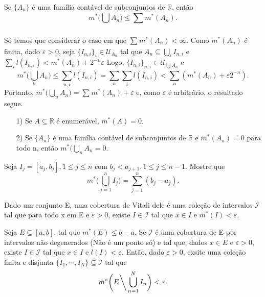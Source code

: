 \documentclass[analysis_notes.tex]{subfiles}
\begin{document}
\begin{lemma*}
	Se \(\{A_{n}\}\) é uma família contável de subconjuntos de \(\mathbb{R}\), então
	\[
		m^{*}\biggl(\bigcup_{}^{}{A_{n}}\biggr)\leq \sum\limits_{}^{}m^{*}(A_{n}).
	\]
\end{lemma*}
\begin{proof*}
	Só temos que considerar o caso em que \(\sum\limits_{}^{}m^{*}(A_{n}) < \infty.\) Como
	\(m^{*}(A_{n})\) é finita, dado \(\varepsilon  > 0\), seja \(\{I_{n, i}\}_{i}\in \mathcal{U}_{A_{n}}\) tal que
	\(A_{n}\subseteq{\bigcup_{i}^{}{I_{n, i}}}\) e \(\sum\limits_{i}^{}l(I_{n, i}) < m^{*}(A_{n}) + 2^{-n}\varepsilon\)
	Logo, \(\{I_{n, i}\}_{n, i}\in \mathcal{U}_{\bigcup_{}^{}{A_{n}}}\) e
	\[
		m^{*}\biggl(\bigcup_{n}^{}{A_{n}}\biggr)\leq \sum\limits_{n, i}^{}l(I_{n, i}) = \sum\limits_{n}^{}\sum\limits_{i}^{}l(I_{n, i}) < \sum\limits_{n}^{}(m^{*}(A_{n}) + \varepsilon 2^{-n}).
	\]
	Portanto, \(m^{*}\biggl(\bigcup_{n}^{}{A_{n}}\biggr) = \sum\limits_{}^{}m^{*}(A_{n}) + \varepsilon\) e, como \(\varepsilon \) é arbitrário, o resultado segue.
\end{proof*}
\begin{crl*}
	\begin{itemize}
		\item[1)] Se \(A\subseteq{\mathbb{R}}\) é enumerável, \(m^{*}(A) = 0.\)
		\item[2)] Se \(\{A_{n}\}\) é uma família contável de subconjuntos de \(\mathbb{R}\) e
		      \(m^{*}(A_{n}) = 0\) para todo n, então \(m^{*}(\bigcup_{n}^{}A_{n} = 0.\)
	\end{itemize}
\end{crl*}
\begin{example}
	Seja \(I_{j} = [a_{j}, b_{j}], 1\leq j\leq n\) com \(b_{j} < a_{j+1}, 1\leq j\leq n-1.\) Mostre que
	\[
		m^{*}\biggl(\bigcup_{j=1}^{n}{I_{j}}\biggr) = \sum\limits_{j=1}^{n}(b_{j}-a_{j}).
	\]
\end{example}
Dado um conjunto E, uma cobertura de Vitali dele é uma cole\c cão de intervalos
\(\mathcal{I}\) tal que para todo x em E e \(\varepsilon  > 0\), existe \(I\in \mathcal{I}\) tal que
\(x\in I\) e \(m^{*}(I) < \varepsilon .\)
\hypertarget{vitali_covering}{
	\begin{lemma*}
		Seja \(E\subseteq{[a, b]}\), tal que \(m^{*}(E)\leq b-a.\) Se \(\mathcal{I}\)
		é uma cobertura de E por intervalos não degenerados (Não é um ponto só) e tal que, dados \(x\in E\) e
		\(\varepsilon >0\), existe \(I\in \mathcal{I}\) tal que \(x\in I\) e \(l(I) < \varepsilon .\)
		Então, dado \(\varepsilon  > 0\), exsite uma cole\c cão finita e disjunta \(\{I_{1}, \cdots, I_{N}\}\subseteq{\mathcal{I}}\)
		tal que
		\[
			m^{*}\biggl(E\biggl\backslash\biggr. \bigcup_{n=1}^{N}{I_{n}}\biggr) < \varepsilon .
		\]
	\end{lemma*}}
\end{document}
